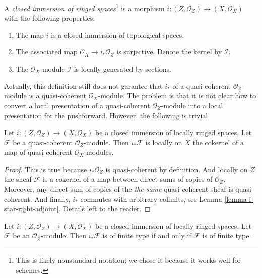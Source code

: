 \begin{definition}
\label{definition-closed-immersion}
A {\it closed immersion of ringed spaces}\footnote{This is
likely nonstandard notation; we chose it because it works well
for schemes.} is a morphism
$i : (Z, \mathcal{O}_Z) \to (X, \mathcal{O}_X)$
with the following properties:
\begin{enumerate}
\item The map $i$ is a closed immersion of topological spaces.
\item The associated map $\mathcal{O}_X \to i_*\mathcal{O}_Z$
is surjective. Denote the kernel by $\mathcal{I}$.
\item The $\mathcal{O}_X$-module $\mathcal{I}$ is locally
generated by sections.
\end{enumerate}
\end{definition}

\noindent
Actually, this definition still does not garantee that
$i_*$ of a quasi-coherent $\mathcal{O}_Z$-module is a
quasi-coherent $\mathcal{O}_X$-module. The problem is that
it is not clear how to convert a local presentation of
a quasi-coherent $\mathcal{O}_Z$-module into a local
presentation for the pushforward. However, the following
is trivial.

\begin{lemma}
\label{lemma-i-star-quasi-coherent}
Let $i : (Z, \mathcal{O}_Z) \to (X, \mathcal{O}_X)$
be a closed immersion of locally ringed spaces.
Let $\mathcal{F}$ be a quasi-coherent $\mathcal{O}_Z$-module.
Then $i_*\mathcal{F}$ is locally on $X$ the cokernel of
a map of quasi-coherent $\mathcal{O}_X$-modules.
\end{lemma}

\begin{proof}
This is true because $i_*\mathcal{O}_Z$ is quasi-coherent
by definition. And locally on $Z$ the sheaf $\mathcal{F}$
is a cokernel of a map between direct sums of copies
of $\mathcal{O}_Z$. Moreover, any direct sum of copies of the
{\it the same} quasi-coherent sheaf is quasi-coherent.
And finally, $i_*$ commutes with arbitrary colimits,
see Lemma \ref{lemma-i-star-right-adjoint}. Details left to the reader.
\end{proof}

\begin{lemma}
\label{lemma-i-star-reflects-finite-type}
Let $i : (Z, \mathcal{O}_Z) \to (X, \mathcal{O}_X)$
be a closed immersion of locally ringed spaces.
Let $\mathcal{F}$ be an $\mathcal{O}_Z$-module.
Then $i_*\mathcal{F}$ is of finite type if and only if
$\mathcal{F}$ is of finite type.
\end{lemma}

